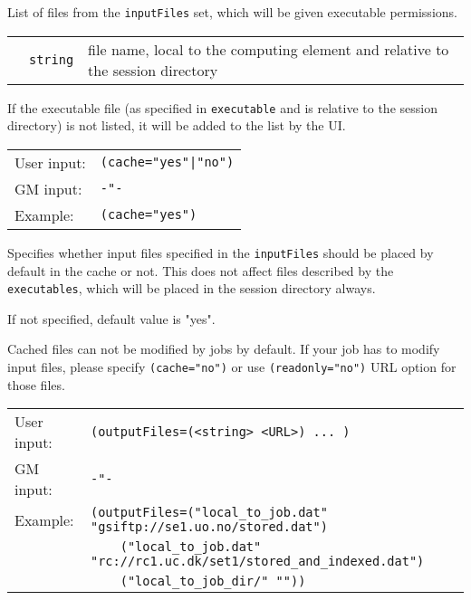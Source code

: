   List of files from the \texttt{inputFiles} set, which will be given
  executable permissions.

  \begin{tabular}{llp{10cm}}
    \hspace*{1cm}&\texttt{string}& file name, local to the computing element and
    relative to the session directory\\
  \end{tabular}

  If the executable file (as specified in \texttt{executable} and is
  relative to the session directory)  is not listed, it will be added
  to the list by the UI.

  \hspace*{0.5cm}
  \begin{shaded}
  \end{shaded}
  \begin{tabular}{lp{13cm}}
    User input:&\verb#(cache="yes"|"no")#\\
    GM input:&\verb#-"-#\\
    Example:&\verb#(cache="yes")#\\
  \end{tabular}

  Specifies whether input files specified in the \texttt{inputFiles}
  should be placed by default in the cache or not. This does not
  affect files described by the \texttt{executables}, which will be
  placed in the session directory always.

  If not specified, default value is "yes".

  \begin{framed}
    Cached files can not be modified by jobs by default. If your job has to 
    modify input files, please specify \texttt{(cache="no")} or use
    \texttt{(readonly="no")} URL option for those files.
  \end{framed}

  \hspace*{0.5cm}
  \begin{shaded}
  \end{shaded}
  \begin{tabular}{lp{13cm}}
    User input:&\verb#(outputFiles=(<string> <URL>) ... )#\\
    GM input:&\verb#-"-#\\
    Example:&\verb#(outputFiles=("local_to_job.dat" "gsiftp://se1.uo.no/stored.dat")#\\
    &\verb#    ("local_to_job.dat" "rc://rc1.uc.dk/set1/stored_and_indexed.dat")#\\  
    &\verb#    ("local_to_job_dir/" ""))#\\  
  \end{tabular}

